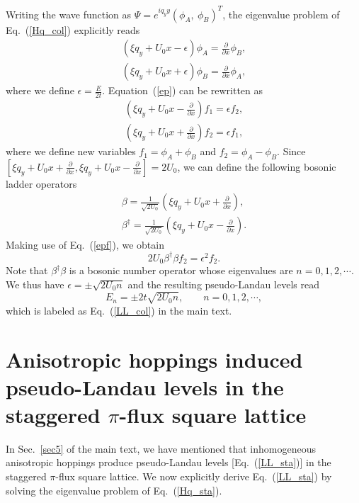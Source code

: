 \documentclass[aps, twocolumn, floatfix, superscriptaddress, prb]{revtex4-1}
\begin{document}
Writing the wave function as $\Psi=e^{iq_yy}(\phi_A,\ \phi_B)^T$, the eigenvalue problem of Eq.~(\ref{Hq_col}) explicitly reads
%
\begin{equation} \label{ep}
\begin{split}
\left(\xi q_y +{U_0}x-\epsilon \right)\phi_A =\frac{\partial }{\partial x}\phi_B,
\\
\left(\xi q_y +{U_0}x+\epsilon \right)\phi_B =\frac{\partial }{\partial x}\phi_A,
\end{split}
\end{equation}
%
where we define $\epsilon=\frac{E}{2t}$. Equation~(\ref{ep}) can be rewritten as
%
\begin{equation} \label{epf}
\begin{split}
\left(\xi q_y + {U_0}x-\frac{\partial }{\partial x}\right)f_1 =\epsilon f_2,
\\
\left(\xi q_y + {U_0}x+\frac{\partial }{\partial x}\right)f_2 =\epsilon f_1,
\end{split}
\end{equation}
%
where we define new variables $f_1=\phi_A+\phi_B$ and $f_2=\phi_A-\phi_B$. Since ${[\xi q_y + U_0x+\frac{\partial }{\partial x}, \xi q_y + U_0x-\frac{\partial }{\partial x}] = 2U_0}$, we can define the following bosonic ladder operators
%
\begin{equation}
\begin{split}
\beta=\frac{1}{\sqrt{2{U_0}}}\left(\xi q_y +{U_0}x+\frac{\partial }{\partial x}\right),
\\
\beta^\dagger=\frac{1}{\sqrt{2{U_0}}}\left(\xi q_y +{U_0}x-\frac{\partial }{\partial x}\right).
\end{split}
\end{equation}
%
Making use of Eq.~(\ref{epf}), we obtain
%
\begin{equation}
2{U_0}\beta^{\dagger } \beta f_2 =\epsilon^2 f_2.
\end{equation}
%
Note that $\beta^\dagger\beta$ is a bosonic number operator whose eigenvalues are $n=0,1,2,\cdots$. We thus have $\epsilon=\pm\sqrt{2 {U_0} n}$ and the resulting pseudo-Landau levels read
%
\begin{equation}
E_n=\pm2t\sqrt{2{U_0}n},\qquad n=0,1,2,\cdots,
\end{equation}
%
which is labeled as Eq.~(\ref{LL_col}) in the main text.




\section{{Anisotropic hoppings induced pseudo-Landau levels in the staggered $\pi$-flux square lattice}}
\label{a2}
In Sec.~\ref{sec5} of the main text, we have mentioned that  inhomogeneous anisotropic hoppings produce pseudo-Landau levels [Eq.~(\ref{LL_sta})] in the staggered $\pi$-flux square lattice. We now explicitly derive Eq.~(\ref{LL_sta}) by solving the eigenvalue problem of Eq.~(\ref{Hq_sta}).
\end{document}
